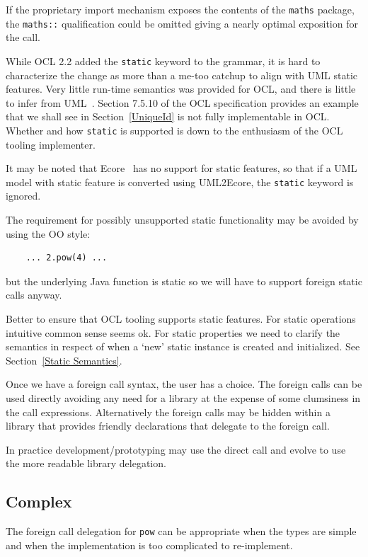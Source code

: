 \documentclass[sigconf]{acmart}
\begin{document}
If the proprietary import mechanism exposes the contents of the \verb|maths| package, the \verb|maths::| qualification could be omitted giving a nearly optimal exposition for the call.

While OCL 2.2 added the \verb|static| keyword to the grammar, it is hard to characterize the change as more than a me-too catchup to align with UML static features. Very little run-time semantics was provided for OCL, and there is little to infer from UML~\cite{UML-2.5.1}. Section 7.5.10 of the OCL specification provides an example that we shall see in Section~\ref{UniqueId} is not fully implementable in OCL. Whether and how \verb|static| is supported is down to the enthusiasm of the OCL tooling implementer.

It may be noted that Ecore~\cite{Eclipse-EMF} has no support for static features, so that if a UML model with static feature is converted using UML2Ecore, the \verb|static| keyword is ignored.

The requirement for possibly unsupported static functionality may be avoided by using the OO style:

\begin{verbatim}
    ... 2.pow(4) ...
\end{verbatim} 

but the underlying Java function is static so we will have to support foreign static calls anyway.

Better to ensure that OCL tooling supports static features. For static operations intuitive common sense seems ok. For static properties we need to clarify the semantics in respect of when a `new' static instance is created and initialized. See Section~\ref{Static Semantics}.

Once we have a foreign call syntax, the user has a choice. The foreign calls can be used directly avoiding any need for a library at the expense of some clumsiness in the call expressions. Alternatively the foreign calls may be hidden within a library that provides friendly declarations that delegate to the foreign call.

In practice development/prototyping may use the direct call and evolve to use the more readable library delegation.

\subsection{Complex}

The foreign call delegation for \verb|pow| can be appropriate when the types are simple and when the implementation is too complicated to re-implement.
\end{document}
